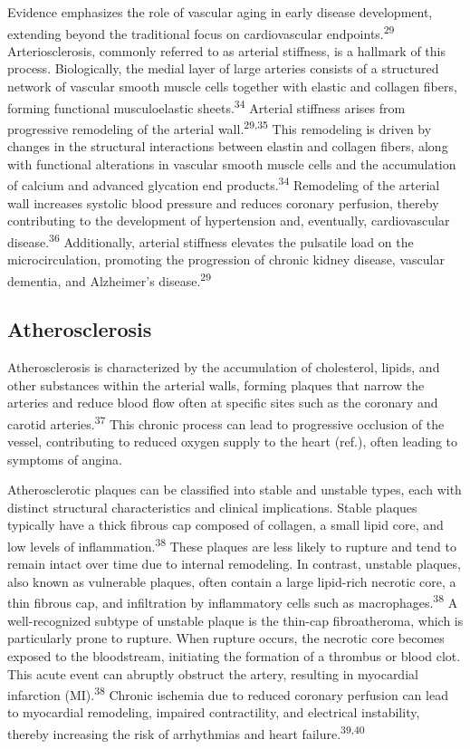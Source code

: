 \documentclass[
  letterpaper,
  headsepline=true,
  open=any]{scrbook}
\begin{document}
Evidence emphasizes the role of vascular aging in early disease
development, extending beyond the traditional focus on cardiovascular
endpoints.\textsuperscript{29} Arteriosclerosis, commonly referred to as
arterial stiffness, is a hallmark of this process. Biologically, the
medial layer of large arteries consists of a structured network of
vascular smooth muscle cells together with elastic and collagen fibers,
forming functional musculoelastic sheets.\textsuperscript{34} Arterial
stiffness arises from progressive remodeling of the arterial
wall.\textsuperscript{29,35} This remodeling is driven by changes in the
structural interactions between elastin and collagen fibers, along with
functional alterations in vascular smooth muscle cells and the
accumulation of calcium and advanced glycation end
products.\textsuperscript{34} Remodeling of the arterial wall increases
systolic blood pressure and reduces coronary perfusion, thereby
contributing to the development of hypertension and, eventually,
cardiovascular disease.\textsuperscript{36} Additionally, arterial
stiffness elevates the pulsatile load on the microcirculation, promoting
the progression of chronic kidney disease, vascular dementia, and
Alzheimer's disease.\textsuperscript{29}

\hypertarget{atherosclerosis}{%
\subsection{Atherosclerosis}\label{atherosclerosis}}

Atherosclerosis is characterized by the accumulation of cholesterol,
lipids, and other substances within the arterial walls, forming plaques
that narrow the arteries and reduce blood flow often at specific sites
such as the coronary and carotid arteries.\textsuperscript{37} This
chronic process can lead to progressive occlusion of the vessel,
contributing to reduced oxygen supply to the heart (ref.), often leading
to symptoms of angina.

Atherosclerotic plaques can be classified into stable and unstable
types, each with distinct structural characteristics and clinical
implications. Stable plaques typically have a thick fibrous cap composed
of collagen, a small lipid core, and low levels of
inflammation.\textsuperscript{38} These plaques are less likely to
rupture and tend to remain intact over time due to internal remodeling.
In contrast, unstable plaques, also known as vulnerable plaques, often
contain a large lipid-rich necrotic core, a thin fibrous cap, and
infiltration by inflammatory cells such as
macrophages.\textsuperscript{38} A well-recognized subtype of unstable
plaque is the thin-cap fibroatheroma, which is particularly prone to
rupture. When rupture occurs, the necrotic core becomes exposed to the
bloodstream, initiating the formation of a thrombus or blood clot. This
acute event can abruptly obstruct the artery, resulting in myocardial
infarction (MI).\textsuperscript{38} Chronic ischemia due to reduced
coronary perfusion can lead to myocardial remodeling, impaired
contractility, and electrical instability, thereby increasing the risk
of arrhythmias and heart failure.\textsuperscript{39,40}
\end{document}
